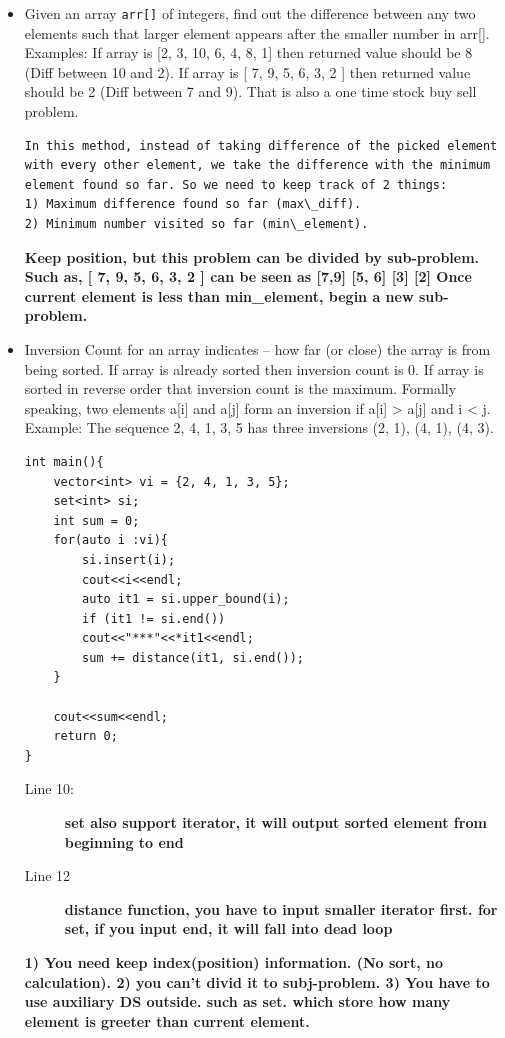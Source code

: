 \documentclass[a4paper,11pt,twoside]{book}
\begin{document}
\begin{itemize}
	\item Given an array \texttt{arr[]} of integers, find out the difference between any two elements such that larger element appears after the smaller number in arr[]. Examples: If array is [2, 3, 10, 6, 4, 8, 1] then returned value should be 8 (Diff between 10 and 2). If array is [ 7, 9, 5, 6, 3, 2 ] then returned value should be 2 (Diff between 7 and 9). That is also a one time stock buy sell problem.
\begin{lstlisting}[breaklines]
In this method, instead of taking difference of the picked element with every other element, we take the difference with the minimum element found so far. So we need to keep track of 2 things:
1) Maximum difference found so far (max\_diff).
2) Minimum number visited so far (min\_element).
\end{lstlisting}
\textbf{Keep position, but this problem can be divided by sub-problem. Such as, [ 7, 9, 5, 6, 3, 2 ] can be seen as [7,9] [5, 6] [3] [2]  Once current element is less than min\_element, begin a new sub-problem.}


	\item Inversion Count for an array indicates -- how far (or close) the array is from being sorted. If array is already sorted then inversion count is 0. If array is sorted in reverse order that inversion count is the maximum. Formally speaking, two elements a[i] and a[j] form an inversion if a[i] > a[j] and i < j. Example: The sequence 2, 4, 1, 3, 5 has three inversions (2, 1), (4, 1), (4, 3).

\begin{lstlisting}[breaklines]
int main(){
	vector<int> vi = {2, 4, 1, 3, 5};
	set<int> si;
	int sum = 0;
	for(auto i :vi){
		si.insert(i);
		cout<<i<<endl;
		auto it1 = si.upper_bound(i);
		if (it1 != si.end())
		cout<<"***"<<*it1<<endl;
		sum += distance(it1, si.end());
	}
	
	cout<<sum<<endl;
	return 0;
}
\end{lstlisting}
\begin{description}
	\item[Line 10:] \textbf{set also support iterator, it will output sorted element from beginning to end }
	\item[Line 12] \textbf{distance function, you have to input smaller iterator first. for set, if you input end, it will fall into dead loop}
\end{description}

\textbf{1) You need keep index(position) information. (No sort, no calculation).  2) you can't divid it to subj-problem. 3) You have to use auxiliary DS outside. such as set. which store how many element is greeter than current element.  }



\end{itemize}
\end{document}
